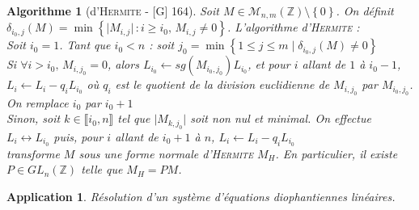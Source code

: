 \documentclass[10pt, a4paper, parskip=full, twoside, twocolumn]{report}
\newtheorem{application}[definition]{Application}
\newtheorem{algorithm}[definition]{Algorithme}
\newcommand{\IZ}{\mathbb{Z}}
\newcommand{\M}{\mathcal{M}}
\begin{document}
\begin{algorithm}[d'\textsc{Hermite} - \textnormal{[G] 164}]
	Soit $M\in \M_{n,m}(\IZ)\setminus \left\{0\right\}$.
	On définit $\delta_{i_0,j}(M) = \min \left\{\vert M_{i,j}\vert \,\colon i \geq i_0,\, M_{i,j}\neq 0\right\}$.
	L'algorithme d'\textsc{Hermite} : \\

	\emph{Soit $i_0=1$. Tant que $i_0 < n$ : soit $j_0 = \min \left\{1\leq j\leq m \mid \delta_{i_0, j}(M)\neq 0\right\}$} \\
	\indent\indent\emph{Si $\forall i > i_0,\, M_{i,j_0} = 0$, alors $L_{i_0} \longleftarrow sg(M_{i_0, j_0})L_{i_0}$, et pour $i$ allant
	de $1$ à $i_0 - 1$, $L_i \longleftarrow L_i - q_iL_{i_0}$ où $q_i$ est le quotient de la division euclidienne de $M_{i,j_0}$ par $M_{i_0,j_0}$. 
	On remplace $i_0$ par $i_0 + 1$} \\
	\indent\indent\emph{Sinon, soit $k\in \llbracket i_0, n\rrbracket$ tel que $\vert M_{k,j_0}\vert$ soit non nul et minimal.
	On effectue $L_i \longleftrightarrow L_{i_0}$ puis, pour $i$ allant de $i_0+1$ à $n$, $L_i\longleftarrow L_i - q_iL_{i_0}$}
	\\

	transforme $M$ sous une forme normale d'\textsc{Hermite} $M_H$.
	En particulier, il existe $P\in GL_n(\IZ)$ telle que $M_H = PM$.
\end{algorithm}

\begin{application}
	Résolution d'un système d'équations diophantiennes linéaires.
\end{application}
\end{document}
